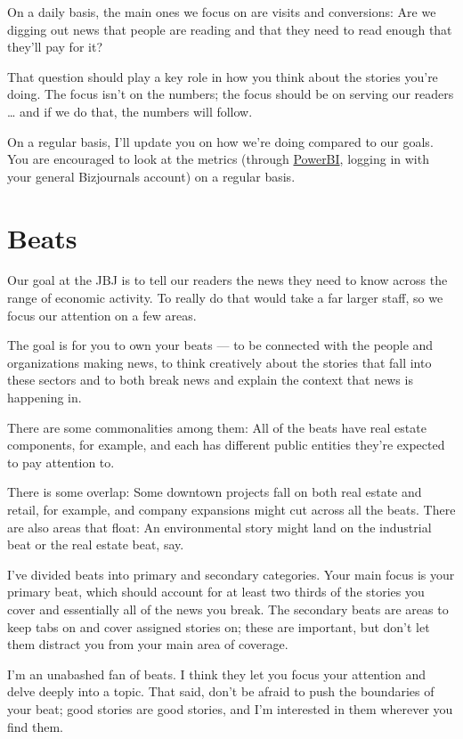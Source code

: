 \documentclass[
  11pt,
  american,
  letterpaperpaper,
  extrafontsizes,onecolumn,openright
  ]{memoir}
\begin{document}
On a daily basis, the main ones we focus on are visits and conversions: Are we digging out news that people are reading and that they need to read enough that they'll pay for it?

That question should play a key role in how you think about the stories you're doing. The focus isn't on the numbers; the focus should be on serving our readers \ldots{} and if we do that, the numbers will follow.

On a regular basis, I'll update you on how we're doing compared to our goals. You are encouraged to look at the metrics (through \href{https://app.powerbi.com/home?experience=power-bi}{PowerBI}, logging in with your general Bizjournals account) on a regular basis.

\hypertarget{beats}{%
\chapter{Beats}\label{beats}}

Our goal at the JBJ is to tell our readers the news they need to know across the range of economic activity. To really do that would take a far larger staff, so we focus our attention on a few areas.

The goal is for you to own your beats --- to be connected with the people and organizations making news, to think creatively about the stories that fall into these sectors and to both break news and explain the context that news is happening in.

There are some commonalities among them: All of the beats have real estate components, for example, and each has different public entities they're expected to pay attention to.

There is some overlap: Some downtown projects fall on both real estate and retail, for example, and company expansions might cut across all the beats. There are also areas that float: An environmental story might land on the industrial beat or the real estate beat, say.

I've divided beats into primary and secondary categories. Your main focus is your primary beat, which should account for at least two thirds of the stories you cover and essentially all of the news you break. The secondary beats are areas to keep tabs on and cover assigned stories on; these are important, but don't let them distract you from your main area of coverage.

I'm an unabashed fan of beats. I think they let you focus your attention and delve deeply into a topic. That said, don't be afraid to push the boundaries of your beat; good stories are good stories, and I'm interested in them wherever you find them.
\end{document}

